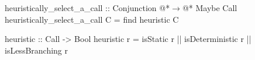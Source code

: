 \documentclass[12pt,a4paper]{report}
\begin{document}
\thispagestyle{empty}
\begin{figure}[h]
\begin{PseudoCode}[moredelim={[is][stringstyle]{@@}{@@}},
  moredelim={[is][\color{dkgreen}\bfseries]{@!}{@!}},
  moredelim={[is][\color{red}\bfseries]{!!}{!!}}]
heuristically_select_a_call :: Conjunction @*$\to$@* Maybe Call
heuristically_select_a_call C =
  find heuristic C

heuristic :: Call -> Bool
heuristic r =
  isStatic r || isDeterministic r || isLessBranching r
\end{PseudoCode}
\end{figure}
\end{document}

